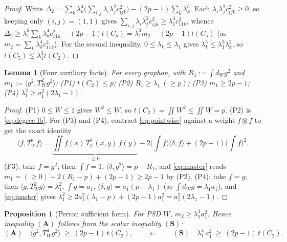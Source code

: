 \documentclass[11pt]{article}
\newtheorem{proposition}[theorem]{Proposition}
\newtheorem{lemma}[theorem]{Lemma}
\theoremstyle{definition}
\newcommand{\tw}{T_W}
\newcommand{\tu}{T_U}
\begin{document}
\begin{proof}
Write $\Delta_2=\sum_k\lambda_k^4\big(\sum_{i,j}\lambda_i\lambda_j^2 c_{ijk}^2\big)
-(2p-1)\sum_k\lambda_k^5$.  Each $\lambda_i\lambda_j^2 c_{ijk}^2\ge0$, so keeping
only $(i,j)=(1,1)$ gives $\sum_{i,j}\lambda_i\lambda_j^2 c_{ijk}^2\ge\lambda_1^3
c_{11k}^2$, whence $\Delta_2\ge\lambda_1^3\sum_k\lambda_k^4 c_{11k}^2-(2p-1)t(C_5)
=\lambda_1^3 m_2-(2p-1)t(C_5)$ (as $m_2=\sum_k\lambda_k^4 c_{11k}^2$).  For the
second inequality, $0\le\lambda_k\le\lambda_1$ gives $\lambda_k^5\le\lambda_1^3
\lambda_k^2$, so $t(C_5)\le\lambda_1^3 t(C_2)$.
\end{proof}

\begin{lemma}[Four auxiliary facts]\label{lem:aux}
For every graphon, with $R_1:=\int d_W g^2$ and $m_1:=\langle g^2,\tw^2 g^2\rangle$:
\textup{(P1)} $t(C_2)\le p$; \textup{(P2)} $R_1\ge\lambda_1\ (\ge p)$;
\textup{(P3)} $m_1\ge2p-1$; \textup{(P4)} $\lambda_1^2\ge a_1^2(2\lambda_1-1)$.
\end{lemma}

\begin{proof}
(P1) $0\le W\le1$ gives $W^2\le W$, so $t(C_2)=\iint W^2\le\iint W=p$.
(P2) is \eqref{eq:degree-lb}.  For (P3) and (P4), contract \eqref{eq:pointwise}
against a weight $f\otimes f$ to get the exact identity
\begin{equation}\label{eq:master}
  \langle f,\tw^2 f\rangle
  =\underbrace{\iint f(x)\,\tu^2(x,y)\,f(y)}_{\ge0}
  -2\Big(\textstyle\int f\Big)\langle\delta,f\rangle+(2p-1)\Big(\textstyle\int f\Big)^2 .
\end{equation}
(P3): take $f=g^2$; then $\int f=1$, $\langle\delta,g^2\rangle=p-R_1$, and
\eqref{eq:master} reads $m_1=(\ge0)+2(R_1-p)+(2p-1)\ge2p-1$ by (P2).
(P4): take $f=g$; then $\langle g,\tw^2 g\rangle=\lambda_1^2$, $\int g=a_1$,
$\langle\delta,g\rangle=a_1(p-\lambda_1)$ (as $\int d_W g=\lambda_1 a_1$), and
\eqref{eq:master} gives $\lambda_1^2\ge2a_1^2(\lambda_1-p)+(2p-1)a_1^2
=a_1^2(2\lambda_1-1)$.
\end{proof}

\begin{proposition}[Perron sufficient form]\label{prop:S}
For PSD $W$, $m_2\ge\lambda_1^4 a_1^2$.  Hence inequality $(\mathbf A)$ follows
from the scalar inequality $(\mathbf S)$:
\[
  (\mathbf A)\quad \langle g^2,\tw^4 g^2\rangle\ \ge\ (2p-1)\,t(C_2),
  \qquad\Longleftarrow\qquad
  (\mathbf S)\quad \lambda_1^4\,a_1^2\ \ge\ (2p-1)\,t(C_2).
\]
\end{proposition}
\end{document}
